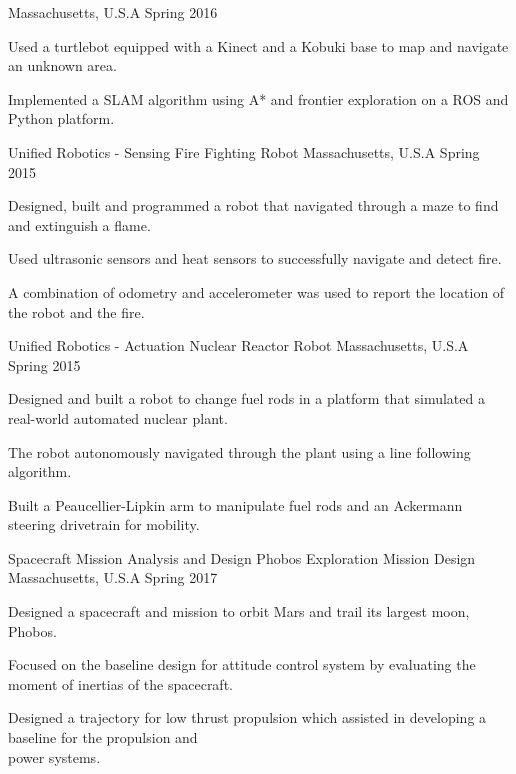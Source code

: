 \begin{cventries}
    {Massachusetts, U.S.A}
    {Spring 2016}
    {
      \begin{cvitems}
        \item {Used a turtlebot equipped with a Kinect and a Kobuki base to map and navigate an unknown area.}
        \item {Implemented a SLAM algorithm using A* and frontier exploration on a ROS and Python platform.}
      \end{cvitems}
     }
	\cventry
    {Unified Robotics - Sensing}
    {Fire Fighting Robot}
    {Massachusetts, U.S.A}
    {Spring 2015}
    {
      \begin{cvitems}
        \item {Designed, built and programmed a robot that navigated through a maze to find and extinguish a flame.}
        \item {Used ultrasonic sensors and heat sensors to successfully navigate and detect fire.}
        \item {A combination of odometry and accelerometer was used to report the location of the robot and the fire.}
      \end{cvitems}
     }
	\cventry
    {Unified Robotics - Actuation}
    {Nuclear Reactor Robot}
    {Massachusetts, U.S.A}
    {Spring 2015}
    {
      \begin{cvitems}
        \item {Designed and built a robot to change fuel rods in a platform that simulated a real-world automated nuclear plant.}
        \item {The robot autonomously navigated through the plant using a line following algorithm.}
        \item {Built a Peaucellier-Lipkin arm to manipulate fuel rods and an Ackermann steering drivetrain for mobility.}
      \end{cvitems}
     }   
    \cventry
    {Spacecraft Mission Analysis and Design}
    {Phobos Exploration Mission Design}
    {Massachusetts, U.S.A}
    {Spring 2017}
    {
      \begin{cvitems}
        \item {Designed a spacecraft and mission to orbit Mars and trail its largest moon, Phobos.}
        \item {Focused on the baseline design for attitude control system by evaluating the moment of inertias of the spacecraft.}
        \item {Designed a trajectory for low thrust propulsion which assisted in developing a baseline for the propulsion and \\power systems.}

\end{cvitems}}
\end{cventries}
